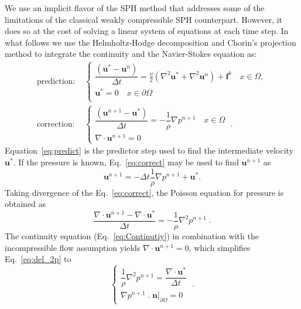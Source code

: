 \documentclass[final,3p,times]{elsarticle}
\begin{document}
We use an implicit flavor of the SPH method that addresses some of the limitations of the classical weakly compressible SPH counterpart. However, it does so at the cost of solving a linear system of equations at each time step. In what follows we use the Helmholtz-Hodge decomposition and Chorin's projection method \cite{chorin1968numerical} to integrate the continuity and the Navier-Stokes equation as:
\begin{align}
\text{prediction:  }&\begin{cases}\label{eq:predict} 
\dfrac{(\mathbf{u}^*-\mathbf{u}^n)}{\Delta t}=\frac{\nu}{2}(\nabla^2\mathbf{u}^* +\nabla^2\mathbf{u}^n) + \mathbf{f}^b\quad x\in \Omega,\\
 \mathbf{u}^*=0 \quad x\in \partial\Omega\\
\end{cases}  \\
\text{correction:  }&\begin{cases}\label{eq:correct} 
\dfrac{(\mathbf{u}^{n+1}-\mathbf{u}^*)}{\Delta t}=-\dfrac{1}{\rho} \nabla p^{n+1}\quad x\in \Omega \\
\nabla\cdot\mathbf{u}^{n+1}=0
\end{cases}  \; .
\end{align}
Equation~\eqref{eq:predict} is the predictor step used to find the intermediate velocity $\mathbf{u}^*$. If the pressure is known, Eq.~\eqref{eq:correct} may be used to find $\mathbf{u}^{n+1}$ as 
\begin{equation}\label{eq:u_new}
\mathbf{u}^{n+1}=-{\Delta t}\dfrac{1}{\rho} \nabla p^{n+1}+\mathbf{u}^*.
\end{equation}
Taking divergence of the Eq.~\eqref{eq:correct}, the Poisson equation for pressure is obtained as 
\begin{equation}\label{eq:del_2p}
\dfrac{\nabla\cdot\mathbf{u}^{n+1}-\nabla\cdot \mathbf{u}^*}{\Delta t}=-\dfrac{1}{\rho} \nabla^2 p^{n+1} \; .
\end{equation}
The continuity equation (Eq.~\eqref{eq:Continutiy}) in combination with the incompressible flow assumption yields $\nabla \cdot \mathbf{u}^{n+1} =0$, which simplifies Eq.~\eqref{eq:del_2p} to 
\begin{equation}\label{eq:pressure}
\begin{cases}
\dfrac{1}{\rho} \nabla^2 p^{n+1}=\dfrac{\nabla \cdot \mathbf{u}^*}{\Delta t}\\
\nabla p^{n+1}\;.\;\mathbf{n}|_{\partial \Omega}=0
  \end{cases} \; .
\end{equation}
\end{document}
